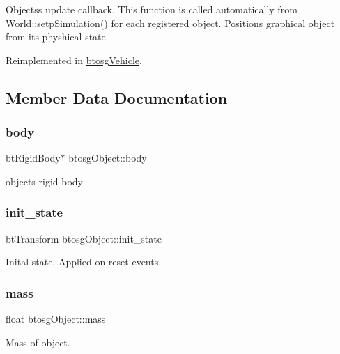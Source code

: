 Objects\textquotesingle{}s update callback. This function is called automatically from World\+::setp\+Simulation() for each registered object. Positions graphical object from its physhical state. 

Reimplemented in \hyperlink{classbtosgVehicle_a5fd0f471df492ac232c9b772a28bd2b9}{btosg\+Vehicle}.



\subsection{Member Data Documentation}
\mbox{\label{classbtosgObject_a64ccde0543c184ed1749fdb9c9699785}} 
\subsubsection{\texorpdfstring{body}{body}}
{\footnotesize\ttfamily bt\+Rigid\+Body$\ast$ btosg\+Object\+::body}



object\textquotesingle{}s rigid body 

\mbox{\label{classbtosgObject_a2dee023f311114e200df9b04c8c1b400}} 
\subsubsection{\texorpdfstring{init\+\_\+state}{init\_state}}
{\footnotesize\ttfamily bt\+Transform btosg\+Object\+::init\+\_\+state}



Inital state. Applied on reset events. 

\mbox{\label{classbtosgObject_a2418bb2194d5e9b0f1c51c84672ba7d1}} 
\subsubsection{\texorpdfstring{mass}{mass}}
{\footnotesize\ttfamily float btosg\+Object\+::mass}



Mass of object. 

